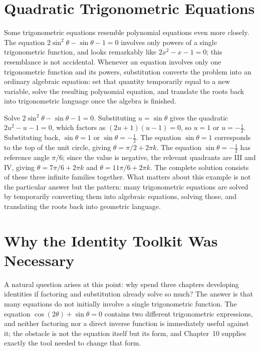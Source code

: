 \section{Quadratic Trigonometric Equations}

Some trigonometric equations resemble polynomial equations even more
closely. The equation $2\sin^2\theta - \sin\theta - 1 = 0$ involves only
powers of a single trigonometric function, and looks remarkably like
$2x^2 - x - 1 = 0$; this resemblance is not accidental. Whenever an
equation involves only one trigonometric function and its powers,
substitution converts the problem into an ordinary algebraic equation: set
that quantity temporarily equal to a new variable, solve the resulting
polynomial equation, and translate the roots back into trigonometric
language once the algebra is finished.

\begin{example}
Solve $2\sin^2\theta - \sin\theta - 1 = 0$. Substituting $u = \sin\theta$
gives the quadratic $2u^2 - u - 1 = 0$, which factors as
$(2u+1)(u-1) = 0$, so $u = 1$ or $u = -\tfrac12$. Substituting back,
$\sin\theta = 1$ or $\sin\theta = -\tfrac12$. The equation $\sin\theta = 1$
corresponds to the top of the unit circle, giving $\theta = \pi/2 + 2\pi
k$. The equation $\sin\theta = -\tfrac12$ has reference angle $\pi/6$; since
the value is negative, the relevant quadrants are III and IV, giving
$\theta = 7\pi/6 + 2\pi k$ and $\theta = 11\pi/6 + 2\pi k$. The complete
solution consists of these three infinite families together. What matters
about this example is not the particular answer but the pattern: many
trigonometric equations are solved by temporarily converting them into
algebraic equations, solving those, and translating the roots back into
geometric language.
\end{example}

\section{Why the Identity Toolkit Was Necessary}

A natural question arises at this point: why spend three chapters
developing identities if factoring and substitution already solve so much?
The answer is that many equations do not initially involve a single
trigonometric function. The equation $\cos(2\theta) + \sin\theta = 0$
contains two different trigonometric expressions, and neither factoring
nor a direct inverse function is immediately useful against it; the
obstacle is not the equation itself but its form, and Chapter~10 supplies
exactly the tool needed to change that form.

